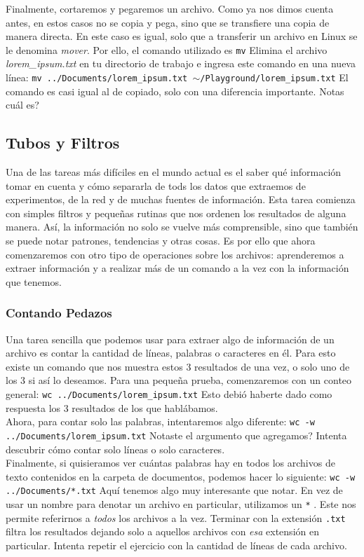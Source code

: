 \documentclass[10pt,letterpaper]{article}
\newcommand{\inlinecode}[1]{
\colorbox{light-gray}{\texttt{#1}}
}
\begin{document}
Finalmente, cortaremos y pegaremos un archivo. Como ya nos dimos cuenta antes, en estos casos no se copia y pega, sino que se transfiere una copia de manera directa. En este caso es igual, solo que a transferir un archivo en Linux se le denomina \emph{mover}. Por ello, el comando utilizado es \inlinecode{mv} Elimina el archivo \emph{lorem\_ipsum.txt} en tu directorio de trabajo e ingresa este comando en una nueva l\'inea: \inlinecode{mv ../Documents/lorem\_ipsum.txt $ \sim $/Playground/lorem\_ipsum.txt} El comando es casi igual al de copiado, solo con una diferencia importante. Notas cu\'al es?

\subsection{Tubos y Filtros}
Una de las tareas m\'as dif\'iciles en el mundo actual es el saber qu\'e informaci\'on tomar en cuenta y c\'omo separarla de tods los datos que extraemos de experimentos, de la red y de muchas fuentes de informaci\'on. Esta tarea comienza con simples filtros y peque\~nas rutinas que nos ordenen los resultados de alguna manera. As\'i, la informaci\'on no solo se vuelve m\'as comprensible, sino que tambi\'en se puede notar patrones, tendencias y otras cosas. Es por ello que ahora comenzaremos con otro tipo de operaciones sobre los archivos: aprenderemos a extraer informaci\'on y a realizar m\'as de un comando a la vez con la informaci\'on que tenemos.

\subsubsection{Contando Pedazos}
Una tarea sencilla que podemos usar para extraer algo de informaci\'on de un archivo es contar la cantidad de l\'ineas, palabras o caracteres en \'el. Para esto existe un comando que nos muestra estos 3 resultados de una vez, o solo uno de los 3 si as\'i lo deseamos. Para una peque\~na prueba, comenzaremos con un conteo general: \inlinecode{wc ../Documents/lorem\_ipsum.txt} Esto debi\'o haberte dado como respuesta los 3 resultados de los que habl\'abamos.\\

Ahora, para contar solo las palabras, intentaremos algo diferente: \inlinecode{wc -w ../Documents/lorem\_ipsum.txt} Notaste el argumento que agregamos? Intenta descubrir c\'omo contar solo l\'ineas o solo caracteres.\\

Finalmente, si quisieramos ver cu\'antas palabras hay en todos los archivos de texto contenidos en la carpeta de documentos, podemos hacer lo siguiente: \inlinecode{wc -w ../Documents/*.txt} Aqu\'i tenemos algo muy interesante que notar. En vez de usar un nombre para denotar un archivo en particular, utilizamos un \inlinecode{*}. Este nos permite referirnos a \emph{todos} los archivos a la vez. Terminar con la extensi\'on \inlinecode{.txt} filtra los resultados dejando solo a aquellos archivos con \emph{esa} extensi\'on en particular. Intenta repetir el ejercicio con la cantidad de l\'ineas de cada archivo.
\end{document}
